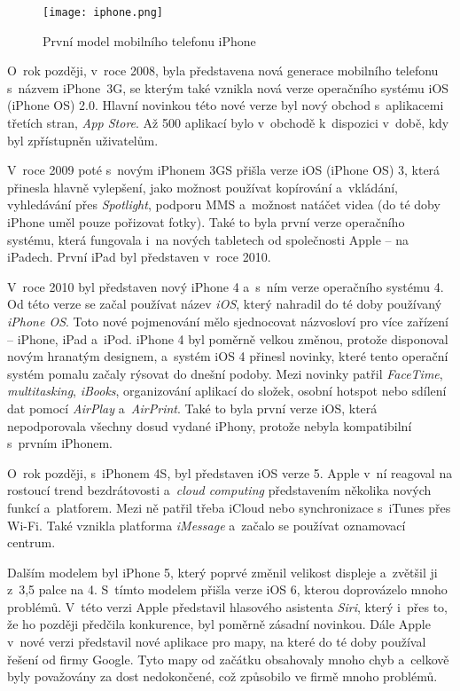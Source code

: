 \begin{figure}[h]
	\centering
	\texttt{[image: iphone.png]}
	\caption{První model mobilního telefonu iPhone \cite{iphone-review}}
\end{figure}

O~rok později, v~roce 2008, byla představena nová generace mobilního telefonu s~názvem iPhone~3G, se kterým také vznikla nová verze operačního systému iOS (iPhone OS) 2.0. Hlavní novinkou této nové verze byl nový obchod s~aplikacemi třetích stran, \emph{App Store}. Až 500 aplikací bylo v~obchodě k~dispozici v~době, kdy byl zpřístupněn uživatelům.

V~roce 2009 poté s~novým iPhonem 3GS přišla verze iOS (iPhone OS) 3, která přinesla hlavně vylepšení, jako možnost používat kopírování a~vkládání, vyhledávání přes \emph{Spotlight}, podporu MMS a~možnost natáčet videa (do té doby iPhone uměl pouze pořizovat fotky). Také to byla první verze operačního systému, která fungovala i~na nových tabletech od společnosti Apple – na iPadech. První iPad byl představen v~roce 2010.

V~roce 2010 byl představen nový iPhone 4 a~s~ním verze operačního systému 4. Od této verze se začal používat název \emph{iOS}, který nahradil do té doby používaný \emph{iPhone OS}. Toto nové pojmenování mělo sjednocovat názvosloví pro více zařízení – iPhone, iPad a~iPod. iPhone 4 byl poměrně velkou změnou, protože disponoval novým hranatým designem, a~systém iOS 4 přinesl novinky, které tento operační systém pomalu začaly rýsovat do dnešní podoby. Mezi novinky patřil \emph{FaceTime}, \emph{multitasking}, \emph{iBooks}, organizování aplikací do složek, osobní hotspot nebo sdílení dat pomocí \emph{AirPlay} a~\emph{AirPrint}. Také to byla první verze iOS, která nepodporovala všechny dosud vydané iPhony, protože nebyla kompatibilní s~prvním iPhonem.

O~rok později, s~iPhonem 4S, byl představen iOS verze 5. Apple v~ní reagoval na rostoucí trend bezdrátovosti a~\emph{cloud computing} představením několika nových funkcí a~platforem. Mezi ně patřil třeba iCloud nebo synchronizace s~iTunes přes Wi-Fi. Také vznikla platforma \emph{iMessage} a~začalo se používat oznamovací centrum.

Dalším modelem byl iPhone 5, který poprvé změnil velikost displeje a~zvětšil ji z~3,5 palce na 4. S~tímto modelem přišla verze iOS 6, kterou doprovázelo mnoho problémů. V~této verzi Apple představil hlasového asistenta \emph{Siri}, který i~přes to, že ho později předčila konkurence, byl poměrně zásadní novinkou. Dále Apple v~nové verzi představil nové aplikace pro mapy, na které do té doby používal řešení od firmy Google. Tyto mapy od začátku obsahovaly mnoho chyb a~celkově byly považovány za dost nedokončené, což způsobilo ve firmě mnoho problémů.

